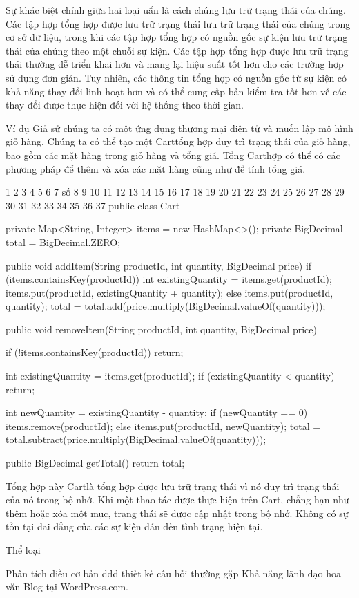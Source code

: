 Sự khác biệt chính giữa hai loại uẩn là cách chúng lưu trữ trạng thái của chúng. Các tập hợp tổng hợp được lưu trữ trạng thái lưu trữ trạng thái của chúng trong cơ sở dữ liệu, trong khi các tập hợp tổng hợp có nguồn gốc sự kiện lưu trữ trạng thái của chúng theo một chuỗi sự kiện. Các tập hợp tổng hợp được lưu trữ trạng thái thường dễ triển khai hơn và mang lại hiệu suất tốt hơn cho các trường hợp sử dụng đơn giản. Tuy nhiên, các thông tin tổng hợp có nguồn gốc từ sự kiện có khả năng thay đổi linh hoạt hơn và có thể cung cấp bản kiểm tra tốt hơn về các thay đổi được thực hiện đối với hệ thống theo thời gian.

Ví dụ
Giả sử chúng ta có một ứng dụng thương mại điện tử và muốn lập mô hình giỏ hàng. Chúng ta có thể tạo một Carttổng hợp duy trì trạng thái của giỏ hàng, bao gồm các mặt hàng trong giỏ hàng và tổng giá. Tổng Carthợp có thể có các phương pháp để thêm và xóa các mặt hàng cũng như để tính tổng giá.

1
2
3
4
5
6
7
số 8
9
10
11
12
13
14
15
16
17
18
19
20
21
22
23
24
25
26
27
28
29
30
31
32
33
34
35
36
37
public class Cart {
  private Map<String, Integer> items = new HashMap<>();
  private BigDecimal total = BigDecimal.ZERO;
 
  public void addItem(String productId, int quantity, BigDecimal price) {
    if (items.containsKey(productId)) {
      int existingQuantity = items.get(productId);
      items.put(productId, existingQuantity + quantity);
    } else {
      items.put(productId, quantity);
    }
    total = total.add(price.multiply(BigDecimal.valueOf(quantity)));
  }
 
  public void removeItem(String productId, int quantity, BigDecimal price) {
    if (!items.containsKey(productId)) {
      return;
    }
 
    int existingQuantity = items.get(productId);
    if (existingQuantity < quantity) {
      return;
    }
 
    int newQuantity = existingQuantity - quantity;
    if (newQuantity == 0) {
      items.remove(productId);
    } else {
      items.put(productId, newQuantity);
    }
    total = total.subtract(price.multiply(BigDecimal.valueOf(quantity)));
  }
 
  public BigDecimal getTotal() {
    return total;
  }
}
Tổng hợp này Cartlà tổng hợp được lưu trữ trạng thái vì nó duy trì trạng thái của nó trong bộ nhớ. Khi một thao tác được thực hiện trên Cart, chẳng hạn như thêm hoặc xóa một mục, trạng thái sẽ được cập nhật trong bộ nhớ. Không có sự tồn tại dai dẳng của các sự kiện dẫn đến tình trạng hiện tại.


Thể loại

Phân tích
điều cơ bản
ddd
thiết kế
câu hỏi thường gặp
Khả năng lãnh đạo
hoa văn
Blog tại WordPress.com.